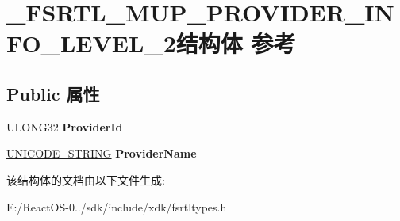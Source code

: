 \hypertarget{struct___f_s_r_t_l___m_u_p___p_r_o_v_i_d_e_r___i_n_f_o___l_e_v_e_l__2}{}\section{\+\_\+\+F\+S\+R\+T\+L\+\_\+\+M\+U\+P\+\_\+\+P\+R\+O\+V\+I\+D\+E\+R\+\_\+\+I\+N\+F\+O\+\_\+\+L\+E\+V\+E\+L\+\_\+2结构体 参考}
\label{struct___f_s_r_t_l___m_u_p___p_r_o_v_i_d_e_r___i_n_f_o___l_e_v_e_l__2}
\subsection*{Public 属性}
\begin{DoxyCompactItemize}
\item 
\mbox{\label{struct___f_s_r_t_l___m_u_p___p_r_o_v_i_d_e_r___i_n_f_o___l_e_v_e_l__2_a5886b192f184e143474695acb91876bf}} 
U\+L\+O\+N\+G32 {\bfseries Provider\+Id}
\item 
\mbox{\label{struct___f_s_r_t_l___m_u_p___p_r_o_v_i_d_e_r___i_n_f_o___l_e_v_e_l__2_a486bd50f4531bc1c8b1d2e63aab6ef8c}} 
\hyperlink{struct___u_n_i_c_o_d_e___s_t_r_i_n_g}{U\+N\+I\+C\+O\+D\+E\+\_\+\+S\+T\+R\+I\+NG} {\bfseries Provider\+Name}
\end{DoxyCompactItemize}


该结构体的文档由以下文件生成\+:\begin{DoxyCompactItemize}
\item 
E\+:/\+React\+O\+S-\/0../sdk/include/xdk/fsrtltypes.\+h\end{DoxyCompactItemize}
